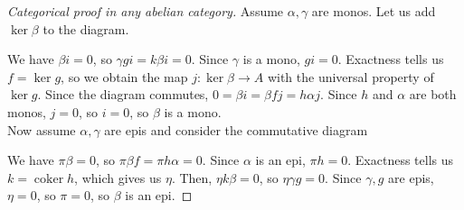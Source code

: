 \documentclass{article}
\DeclareMathOperator{\coker}{coker}
\theoremstyle{plain}
\theoremstyle{definition}
\theoremstyle{remark}
\begin{document}
\begin{proof}[Categorical proof in any abelian category]
    Assume $\alpha,\gamma$ are monos. Let us add $\ker \beta$ to the diagram.
    \begin{center}
    \end{center}
    We have $\beta i = 0$, so $\gamma g i = k \beta i = 0$. Since $\gamma$ is a mono, $gi = 0$. Exactness tells us $f = \ker g$, so we obtain the map $j : \ker \beta \to A$ with the universal property of $\ker g$. Since the diagram commutes, $0 = \beta i = \beta f j = h \alpha j$. Since $h$ and $\alpha$ are both monos, $j = 0$, so $i = 0$, so $\beta$ is a mono. \\
    Now assume $\alpha,\gamma$ are epis and consider the commutative diagram
    \begin{center}
    \end{center}
    We have $\pi \beta = 0$, so $\pi \beta f = \pi h \alpha = 0$. Since $\alpha$ is an epi, $\pi h = 0$. Exactness tells us $k = \coker h$, which gives us $\eta$. Then, $\eta k \beta = 0$, so $\eta \gamma g = 0$. Since $\gamma,g$ are epis, $\eta = 0$, so $\pi = 0$, so $\beta$ is an epi.
\end{proof}
\end{document}
